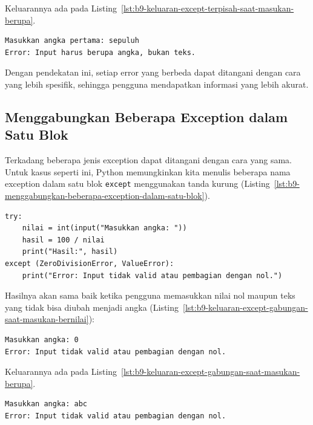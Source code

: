 Keluarannya ada pada Listing~\ref{lst:b9-keluaran-except-terpisah-saat-masukan-berupa}.

\begin{lstlisting}[language=bash, caption={Keluaran except terpisah saat masukan berupa teks}, label={lst:b9-keluaran-except-terpisah-saat-masukan-berupa}]
Masukkan angka pertama: sepuluh
Error: Input harus berupa angka, bukan teks.
\end{lstlisting}

Dengan pendekatan ini, setiap error yang berbeda dapat ditangani dengan cara yang lebih spesifik, sehingga pengguna mendapatkan informasi yang lebih akurat.

\subsection*{Menggabungkan Beberapa Exception dalam Satu Blok}

Terkadang beberapa jenis exception dapat ditangani dengan cara yang sama. Untuk kasus seperti ini, Python memungkinkan kita menulis beberapa nama exception dalam satu blok \texttt{except} menggunakan tanda kurung (Listing~\ref{lst:b9-menggabungkan-beberapa-exception-dalam-satu-blok}).

\begin{lstlisting}[style=PythonStyle, caption={Menggabungkan beberapa exception dalam satu blok}, label={lst:b9-menggabungkan-beberapa-exception-dalam-satu-blok}]
try:
    nilai = int(input("Masukkan angka: "))
    hasil = 100 / nilai
    print("Hasil:", hasil)
except (ZeroDivisionError, ValueError):
    print("Error: Input tidak valid atau pembagian dengan nol.")
\end{lstlisting}

Hasilnya akan sama baik ketika pengguna memasukkan nilai nol maupun teks yang tidak bisa diubah menjadi angka (Listing~\ref{lst:b9-keluaran-except-gabungan-saat-masukan-bernilai}):

\begin{lstlisting}[language=bash, caption={Keluaran except gabungan saat masukan bernilai nol}, label={lst:b9-keluaran-except-gabungan-saat-masukan-bernilai}]
Masukkan angka: 0
Error: Input tidak valid atau pembagian dengan nol.
\end{lstlisting}

Keluarannya ada pada Listing~\ref{lst:b9-keluaran-except-gabungan-saat-masukan-berupa}.

\begin{lstlisting}[language=bash, caption={Keluaran except gabungan saat masukan berupa teks}, label={lst:b9-keluaran-except-gabungan-saat-masukan-berupa}]
Masukkan angka: abc
Error: Input tidak valid atau pembagian dengan nol.
\end{lstlisting}

